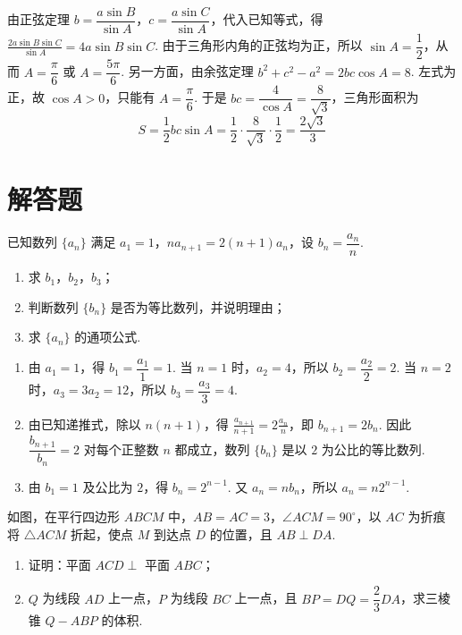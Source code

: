 \begin{solution}
由正弦定理 \(b=\dfrac{a\sin B}{\sin A}\)，\(c=\dfrac{a\sin C}{\sin A}\)，代入已知等式，得 \(\frac{2a\sin B\sin C}{\sin A}=4a\sin B\sin C\).
由于三角形内角的正弦均为正，所以 \(\sin A=\dfrac12\)，从而 \(A=\dfrac{\pi}{6}\) 或 \(A=\dfrac{5\pi}{6}\). 另一方面，由余弦定理
\(b^2+c^2-a^2=2bc\cos A=8\).
左式为正，故 \(\cos A>0\)，只能有 \(A=\dfrac{\pi}{6}\). 于是 \(bc=\dfrac{4}{\cos A}=\dfrac{8}{\sqrt3}\)，三角形面积为
\[
S=\frac12bc\sin A=\frac12\cdot\frac{8}{\sqrt3}\cdot\frac12=\frac{2\sqrt3}{3}
\]
\end{solution}

\section{解答题}

\begin{problem}
已知数列 \(\{a_n\}\) 满足 \(a_1=1\)，\(na_{n+1}=2(n+1)a_n\)，设 \(b_n=\dfrac{a_n}{n}\).

\begin{enumerate}
\item 求 \(b_1\)，\(b_2\)，\(b_3\)；
\item 判断数列 \(\{b_n\}\) 是否为等比数列，并说明理由；
\item 求 \(\{a_n\}\) 的通项公式.
\end{enumerate}
\end{problem}

\begin{solution}
\begin{enumerate}
\item 由 \(a_1=1\)，得 \(b_1=\dfrac{a_1}{1}=1\). 当 \(n=1\) 时，\(a_2=4\)，所以 \(b_2=\dfrac{a_2}{2}=2\). 当 \(n=2\) 时，\(a_3=3a_2=12\)，所以 \(b_3=\dfrac{a_3}{3}=4\).
\item 由已知递推式，除以 \(n(n+1)\)，得
\(\frac{a_{n+1}}{n+1}=2\frac{a_n}{n}\)，即 \(b_{n+1}=2b_n\). 因此 \(\dfrac{b_{n+1}}{b_n}=2\) 对每个正整数 \(n\) 都成立，数列 \(\{b_n\}\) 是以 \(2\) 为公比的等比数列.
\item 由 \(b_1=1\) 及公比为 \(2\)，得 \(b_n=2^{n-1}\). 又 \(a_n=nb_n\)，所以
\(a_n=n2^{n-1}\).
\end{enumerate}
\end{solution}

\begin{problem}
如图，在平行四边形 \(ABCM\) 中，\(AB=AC=3\)，\(\angle ACM=90^\circ\)，以 \(AC\) 为折痕将 \(\triangle ACM\) 折起，使点 \(M\) 到达点 \(D\) 的位置，且 \(AB\perp DA\).

\begin{enumerate}
\item 证明：平面 \(ACD\perp\) 平面 \(ABC\)；
\item \(Q\) 为线段 \(AD\) 上一点，\(P\) 为线段 \(BC\) 上一点，且 \(BP=DQ=\dfrac23DA\)，求三棱锥 \(Q-ABP\) 的体积.
\end{enumerate}

\end{problem}

